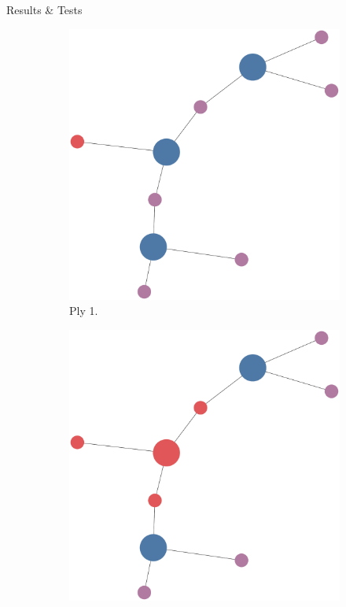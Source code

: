 \documentclass[final]{beamer} %
\begin{document}
\begin{frame}
\begin{columns}
\begin{column}{.33\textwidth}
{\begin{block}{Results \& Tests}
					\begin{figure}[!htb]
						\centering
						\begin{subfigure}[!htb]{0.32\columnwidth}
							\centering
							\includegraphics[width=\columnwidth]{figures/knn_simple_forward_think_0.pdf}
							\caption{Ply 1.}
						\end{subfigure}
						\begin{subfigure}[!htb]{0.32\columnwidth}
							\centering
							\includegraphics[width=\columnwidth]{figures/knn_simple_forward_think_1.pdf}

\end{subfigure}
\end{figure}
\end{block}}
\end{column}
\end{columns}
\end{frame}
\end{document}

